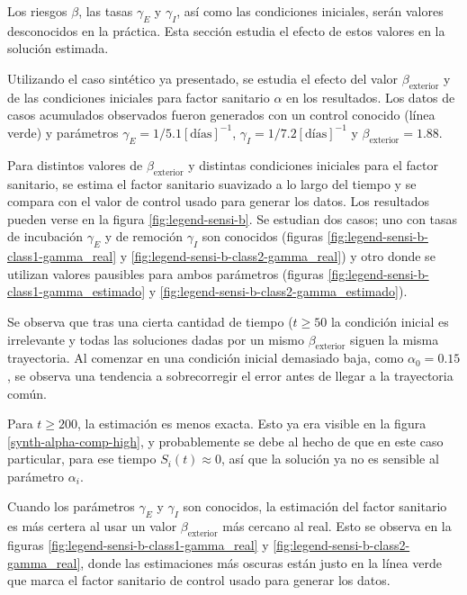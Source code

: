 Los riesgos \(\beta \), las tasas \(\gamma_E\) y \(\gamma_I\), así como las condiciones iniciales, serán valores desconocidos en la práctica. Esta sección estudia el efecto de estos valores en la solución estimada. 

Utilizando el caso sintético ya presentado, se estudia el efecto del valor \(\beta_{\text{exterior}}\) y de las condiciones iniciales para factor sanitario \(\alpha\) en los resultados. Los datos de casos acumulados observados fueron generados con un control conocido (línea verde) y parámetros \(\gamma_E = 1/5.1 [\text{días}]^{-1}\), \(\gamma_I = 1/7.2 [\text{días}]^{-1}\) y \(\beta_{\text{exterior}} = 1.88\).

Para distintos valores de \(\beta_{\text{exterior}}\) y distintas condiciones iniciales para el factor sanitario, se estima el factor sanitario suavizado a lo largo del tiempo y se compara con el valor de control usado para generar los datos. Los resultados pueden verse en la figura \ref{fig:legend-sensi-b}. Se estudian dos casos; uno con tasas de incubación \(\gamma_E\) y de remoción \(\gamma_I\) son conocidos (figuras \ref{fig:legend-sensi-b-class1-gamma_real} y \ref{fig:legend-sensi-b-class2-gamma_real}) y otro donde se utilizan valores pausibles para ambos parámetros (figuras \ref{fig:legend-sensi-b-class1-gamma_estimado} y \ref{fig:legend-sensi-b-class2-gamma_estimado}).

Se observa que tras una cierta cantidad de tiempo (\(t \geq 50\) la condición inicial es irrelevante y todas las soluciones dadas por un mismo \(\beta_{\text{exterior}}\) siguen la misma trayectoria. Al comenzar en una condición inicial demasiado baja, como \(\alpha_0 = 0.15\), se observa una tendencia a sobrecorregir el error antes de llegar a la trayectoria común. 

Para \(t \geq 200\), la estimación es menos exacta. Esto ya era visible en la figura \ref{synth-alpha-comp-high}, y probablemente se debe al hecho de que en este caso particular, para ese tiempo \(S_i(t) \approx 0\), así que la solución ya no es sensible al parámetro \(\alpha_i\).

Cuando los parámetros \(\gamma_E\) y \(\gamma_I\) son conocidos, la estimación del factor sanitario es más certera al usar un valor \(\beta_{\text{exterior}}\) más cercano al real. Esto se observa en la figuras \ref{fig:legend-sensi-b-class1-gamma_real} y \ref{fig:legend-sensi-b-class2-gamma_real}, donde las estimaciones más oscuras están justo en la línea verde que marca el factor sanitario de control usado para generar los datos.

